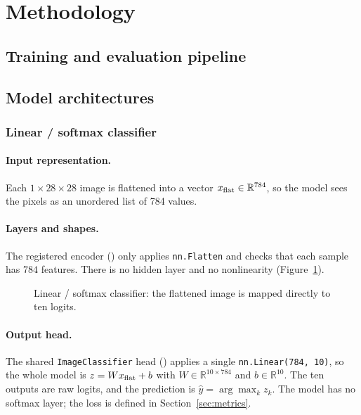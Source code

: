 \section{Methodology}
\label{sec:methods}

\subsection{Training and evaluation pipeline}

\subsection{Model architectures}
\label{sec:architectures}

\subsubsection{Linear / softmax classifier}
\paragraph{Input representation.} Each $1\times28\times28$ image is flattened
into a vector $x_{\rm flat}\in\mathbb{R}^{784}$, so the model sees the pixels as
an unordered list of 784 values.

\paragraph{Layers and shapes.} The registered  encoder
() only applies \texttt{nn.Flatten} and checks
that each sample has $784$ features. There is no hidden layer and no
nonlinearity (Figure~\ref{fig:model-linear}).

\begin{figure}[htbp]
\centering

\caption{Linear / softmax classifier: the flattened image is mapped directly
to ten logits.}
\label{fig:model-linear}
\end{figure}

\paragraph{Output head.} The shared \texttt{ImageClassifier} head
() applies a single
\texttt{nn.Linear(784, 10)}, so the whole model is $z=Wx_{\rm flat}+b$ with
$W\in\mathbb{R}^{10\times784}$ and $b\in\mathbb{R}^{10}$. The ten outputs are
raw logits, and the prediction is $\hat y=\arg\max_k z_k$. The model has no
softmax layer; the loss is defined in Section~\ref{sec:metrics}.

